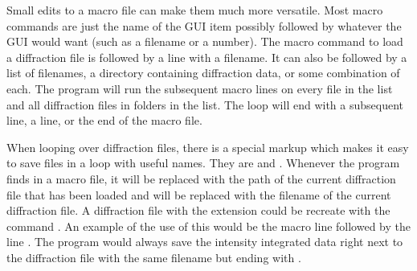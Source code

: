 Small edits to a macro file can make them much more versatile. 
Most macro commands are just the name of the GUI item
possibly followed by whatever the GUI would want (such as a 
filename or a number). The macro command to load a diffraction 
file is  followed by a line with 
a filename. It can also be followed by a list of filenames,
a directory containing diffraction data, or some combination
of each. The program will run the subsequent macro lines on
every file in the list and all diffraction files 
in folders in the list. The loop will end with a subsequent 
 line, a  line, or 
the end of the macro file.

When looping over diffraction files, there is a special 
markup which makes it easy to save files in a loop with 
useful names. They are 
 and . Whenever the
program finds  in a macro file,
it will be replaced with the path of the current
diffraction file that has been loaded and
 will be replaced with the filename of
the current diffraction file. A
diffraction file with the extension  could be 
recreate with the command .
An example of the use of this would be the macro line 
 followed by the line
. The program would always
save the intensity integrated data right next to the diffraction 
file with the same filename but ending with .
